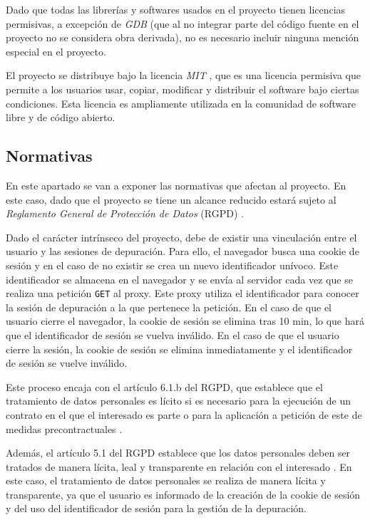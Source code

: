 Dado que todas las librerías y softwares usados en el proyecto tienen licencias permisivas, a excepción de \textit{GDB} (que al no integrar parte del código fuente en el proyecto no se considera obra derivada), no es necesario incluir ninguna mención especial en el proyecto.

El proyecto se distribuye bajo la licencia \textit{MIT} \cite{mit}, que es una licencia permisiva que permite a los usuarios usar, copiar, modificar y distribuir el software bajo ciertas condiciones. Esta licencia es ampliamente utilizada en la comunidad de software libre y de código abierto.

\subsection{Normativas}\label{subsec:normativas}

En este apartado se van a exponer las normativas que afectan al proyecto. En este caso, dado que el proyecto se tiene un alcance reducido estará sujeto al \textit{Reglamento General de Protección de Datos} (RGPD) \cite{rgpd}.

Dado el carácter intrínseco del proyecto, debe de existir una vinculación entre el usuario y las sesiones de depuración. Para ello, el navegador busca una cookie de sesión y en el caso de no existir se crea un nuevo identificador unívoco. Este identificador se almacena en el navegador y se envía al servidor cada vez que se realiza una petición \texttt{GET} al proxy. Este proxy utiliza el identificador para conocer la sesión de depuración a la que pertenece la petición. En el caso de que el usuario cierre el navegador, la cookie de sesión se elimina tras 10 min, lo que hará que el identificador de sesión se vuelva inválido. En el caso de que el usuario cierre la sesión, la cookie de sesión se elimina inmediatamente y el identificador de sesión se vuelve inválido.

Este proceso encaja con el artículo 6.1.b del RGPD, que establece que el tratamiento de datos personales es lícito si es necesario para la ejecución de un contrato en el que el interesado es parte o para la aplicación a petición de este de medidas precontractuales \cite{rgpd_art6}. 

Además, el artículo 5.1 del RGPD establece que los datos personales deben ser tratados de manera lícita, leal y transparente en relación con el interesado \cite{rgpd_art5}. En este caso, el tratamiento de datos personales se realiza de manera lícita y transparente, ya que el usuario es informado de la creación de la cookie de sesión y del uso del identificador de sesión para la gestión de la depuración.


